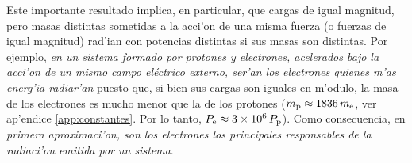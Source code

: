 Este importante resultado implica, en particular, que cargas de igual magnitud, pero masas distintas sometidas a la acci'on de una misma fuerza (o fuerzas de igual magnitud) rad'ian con potencias distintas si sus masas son distintas. Por ejemplo, \textit{en un sistema formado por protones y electrones, acelerados bajo la acci'on de un mismo campo eléctrico externo, ser'an los electrones quienes m'as energ'ia radiar'an} puesto que, si bien sus cargas son iguales en m'odulo, la masa de los electrones es mucho menor que la de los protones ($m_{\rm p}\approx 1836\,m_{\rm e}$, ver ap'endice \ref{app:constantes}. Por lo tanto, $P_{\rm e}\approx 3\times 10^6\, P_{\rm p}$). Como consecuencia, en \textit{primera aproximaci'on, son los electrones los principales responsables de la radiaci'on emitida por un sistema}.


